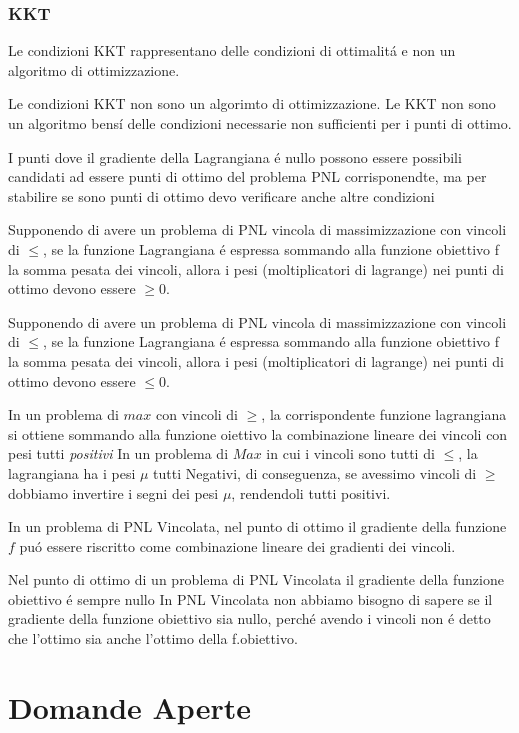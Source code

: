 \documentclass[12pt, a4paper, openany]{book}
\begin{document}
\subsection{KKT}
\affermazionetrue
{Le condizioni KKT rappresentano delle condizioni di ottimalitá e non un algoritmo di ottimizzazione.}

\affermazionetrue
{Le condizioni KKT non sono un algorimto di ottimizzazione.}
{Le KKT non sono un algoritmo bensí delle condizioni necessarie non sufficienti per i punti di ottimo.}

\affermazionetrue
{I punti dove il gradiente della Lagrangiana é nullo possono essere possibili candidati ad essere punti di ottimo del problema PNL corrisponendte,
ma per stabilire se sono punti di ottimo devo verificare anche altre condizioni}
{}

\affermazionetrue
{Supponendo di avere un problema di PNL vincola di massimizzazione con vincoli di $\leq$, se la funzione Lagrangiana é espressa sommando alla funzione obiettivo f la somma pesata dei vincoli, allora i pesi (moltiplicatori di lagrange) nei punti di ottimo devono essere $\geq 0$.}

\affermazionefalse
{Supponendo di avere un problema di PNL vincola di massimizzazione con vincoli di $\leq$, se la funzione Lagrangiana é espressa sommando alla funzione obiettivo f la somma pesata dei vincoli, allora i pesi (moltiplicatori di lagrange) nei punti di ottimo devono essere $\leq 0$.}

\affermazionetrue
{In un problema di $max$ con vincoli di $\geq$, la corrispondente funzione lagrangiana si ottiene sommando alla funzione oiettivo la combinazione lineare dei vincoli con pesi tutti \emph{positivi}}
{In un problema di $Max$ in cui i vincoli sono tutti di $\leq$, la lagrangiana ha i pesi $\mu$ tutti Negativi, di conseguenza, se avessimo vincoli di $\geq$ dobbiamo invertire i segni dei pesi $\mu$, rendendoli tutti positivi.}

\affermazionetrue
{In un problema di PNL Vincolata, nel punto di ottimo il gradiente della funzione $f$ puó essere riscritto come combinazione lineare dei gradienti dei vincoli.}

\affermazionefalse
{Nel punto di ottimo di un problema di PNL Vincolata il gradiente della funzione obiettivo é sempre nullo}
{In PNL Vincolata non abbiamo bisogno di sapere se il gradiente della funzione obiettivo sia nullo, perché avendo i vincoli non é detto che l'ottimo sia anche l'ottimo della f.obiettivo.}

\chapter{Domande Aperte}
\end{document}
